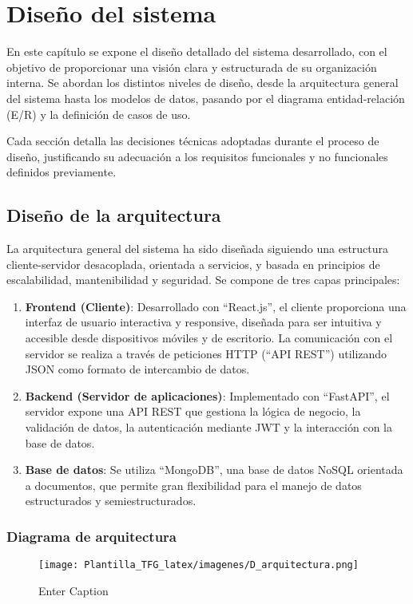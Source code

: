 \chapter{Diseño del sistema}\label{capitulo5}
En este capítulo se expone el diseño detallado del sistema desarrollado, con el objetivo de proporcionar una visión clara y estructurada de su organización interna. Se abordan los distintos niveles de diseño, desde la arquitectura general del sistema hasta los modelos de datos, pasando por el diagrama entidad-relación (E/R) y la definición de casos de uso.

Cada sección detalla las decisiones técnicas adoptadas durante el proceso de diseño, justificando su adecuación a los requisitos funcionales y no funcionales definidos previamente. 

\section{Diseño de la arquitectura}
La arquitectura general del sistema ha sido diseñada siguiendo una estructura cliente-servidor desacoplada, orientada a servicios, y basada en principios de escalabilidad, mantenibilidad y seguridad. Se compone de tres capas principales:

\begin{enumerate}
    \item \textbf{Frontend (Cliente)}: Desarrollado con ``React.js'', el cliente proporciona una interfaz de usuario interactiva y responsive, diseñada para ser intuitiva y accesible desde dispositivos móviles y de escritorio. La comunicación con el servidor se realiza a través de peticiones HTTP (``API REST'') utilizando JSON como formato de intercambio de datos.

    \item \textbf{Backend (Servidor de aplicaciones)}: Implementado con ``FastAPI'', el servidor expone una API REST que gestiona la lógica de negocio, la validación de datos, la autenticación mediante JWT y la interacción con la base de datos. 

    \item \textbf{Base de datos}: Se utiliza ``MongoDB'', una base de datos NoSQL orientada a documentos, que permite gran flexibilidad para el manejo de datos estructurados y semiestructurados. 
\end{enumerate}

\subsection{Diagrama de arquitectura}
\begin{figure}[H]
    \centering
    \texttt{[image: Plantilla\_TFG\_latex/imagenes/D\_arquitectura.png]}
    \caption{Enter Caption}
    \label{fig:enter-label}
\end{figure}

